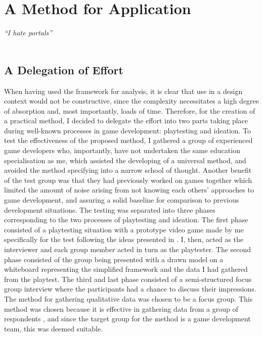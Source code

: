 \chapter{A Method for Application}
\textit{``I hate portals''} \\
 \\

\section{A Delegation of Effort}
When having used the framework for analysis, it is clear that use in a design context would not be constructive, since the complexity necessitates a high degree of absorption and, most importantly, loads of time. Therefore, for the creation of a practical method, I decided to delegate the effort into two parts taking place during well-known processes in game development: playtesting and ideation. To test the effectiveness of the proposed method, I gathered a group of experienced game developers who, importantly, have not undertaken the same education specialisation as me, which assisted the developing of a universal method, and avoided the method specifying into a narrow school of thought. Another benefit of the test group was that they had previously worked on games together which limited the amount of noise arising from not knowing each others' approaches to game development, and assuring a solid baseline for comparison to previous development situations. The testing was separated into three phases corresponding to the two processes of playtesting and ideation. The first phase consisted of a playtesting situation with a prototype video game made by me specifically for the test following the ideas presented in . I, then, acted as the interviewer and each group member acted in turn as the playtester. The second phase consisted of the group being presented with a drawn model on a whiteboard representing the simplified framework and the data I had gathered from the playtest. The third and last phase consisted of a semi-structured focus group interview \cite{cresswell} where the participants had a chance to discuss their impressions. The method for gathering qualitative data was chosen to be a focus group. This method was chosen because it is effective in gathering data from a group of respondents \cite{cresswell}, and since the target group for the method is a game development team, this was deemed suitable.

